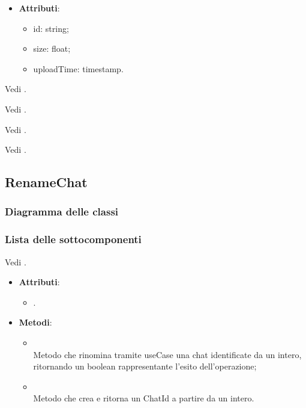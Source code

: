 \documentclass[10pt, a4paper]{article}
\begin{document}
\label{AWSDocumentMetadataDettaglio}
\begin{itemize}
    \item \textbf{Attributi}:
    \begin{itemize}
        \item id: string;
        \item size: float;
        \item uploadTime: timestamp.
    \end{itemize}
\end{itemize}

Vedi .

Vedi .

Vedi .

Vedi .


\subsection{RenameChat}
\subsubsection{Diagramma delle classi}
\subsubsection{Lista delle sottocomponenti}

Vedi .

\label{RenameChatControllerDettaglio}
\begin{itemize}
    \item \textbf{Attributi}:
    \begin{itemize}
        \item {}.
    \end{itemize}
    \item \textbf{Metodi}:
    \begin{itemize}
        \item {}\\
        Metodo che rinomina tramite useCase una chat identificate da un intero, ritornando un boolean rappresentante l'esito dell'operazione;
        \item {}\\
        Metodo che crea e ritorna un ChatId a partire da un intero. 
    \end{itemize}
\end{itemize}
\end{document}
